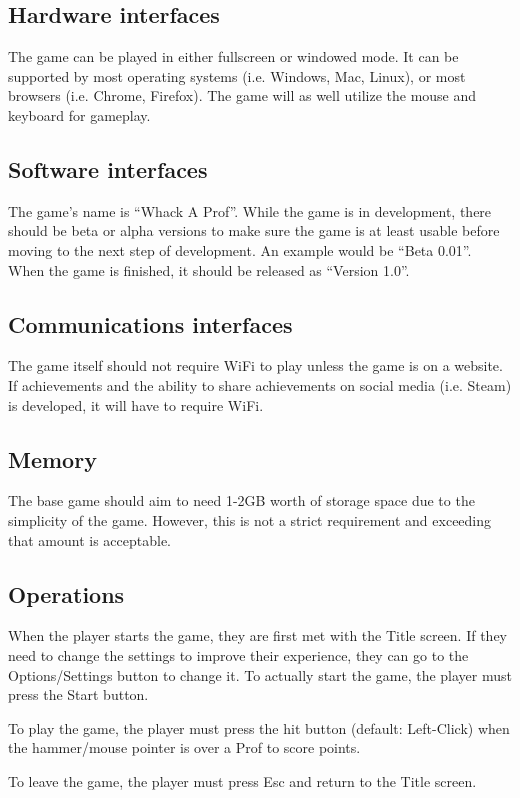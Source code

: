 \documentclass{article}
\begin{document}
\subsection{Hardware interfaces}
The game can be played in either fullscreen or windowed mode. It can be supported by most operating systems (i.e. Windows, Mac, Linux), or most browsers (i.e. Chrome, Firefox). The game will as well utilize the mouse and keyboard for gameplay.

\subsection{Software interfaces}
The game’s name is “Whack A Prof”. While the game is in development, there should be beta or alpha versions to make sure the game is at least usable before moving to the next step of development. An example would be “Beta 0.01”. When the game is finished, it should be released as “Version 1.0”.

\subsection{Communications interfaces}
The game itself should not require WiFi to play unless the game is on a website. If achievements and the ability to share achievements on social media (i.e. Steam) is developed, it will have to require WiFi.

\subsection{Memory}
The base game should aim to need 1-2GB worth of storage space due to the simplicity of the game. However, this is not a strict requirement and exceeding that amount is acceptable.

\subsection{Operations}
When the player starts the game, they are first met with the Title screen. If they need to change the settings to improve their experience, they can go to the Options/Settings button to change it. To actually start the game, the player must press the Start button.

To play the game, the player must press the hit button (default: Left-Click) when the hammer/mouse pointer is over a Prof to score points.

To leave the game, the player must press Esc and return to the Title screen.
\end{document}

